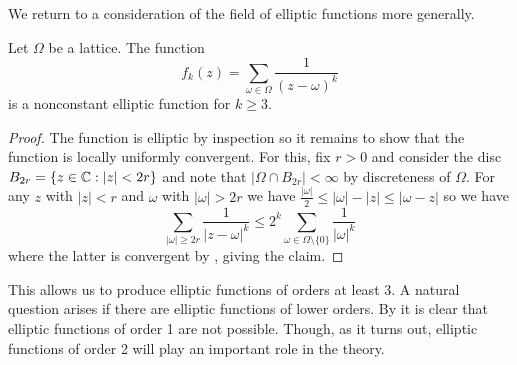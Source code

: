 We return to a consideration of the field of elliptic functions more generally. 
\begin{proposition}\label{prop: fk is elliptic}
    Let $\Omega$ be a lattice. The function 
    $$f_{k}(z)=\sum_{\omega\in\Omega}\frac{1}{(z-\omega)^{k}}$$
    is a nonconstant elliptic function for $k\geq 3$. 
\end{proposition}
\begin{proof}
    The function is elliptic by inspection so it remains to show that the function is locally uniformly convergent. For this, fix $r>0$ and consider the disc $B_{2r}=\{z\in\mathbb{C}:|z|<2r\}$ and note that $|\Omega\cap B_{2r}|<\infty$ by discreteness of $\Omega$. For any $z$ with $|z|<r$ and $\omega$ with $|\omega|>2r$ we have $\frac{|\omega|}{2}\leq|\omega|-|z|\leq|\omega-z|$ so we have 
    $$\sum_{|\omega|\geq 2r}\frac{1}{|z-\omega|^{k}}\leq 2^{k}\sum_{\omega\in\Omega\setminus\{0\}}\frac{1}{|\omega|^{k}}$$
    where the latter is convergent by , giving the claim. 
\end{proof}
This allows us to produce elliptic functions of orders at least 3. A natural question arises if there are elliptic functions of lower orders. By  it is clear that elliptic functions of order 1 are not possible. Though, as it turns out, elliptic functions of order 2 will play an important role in the theory. 

